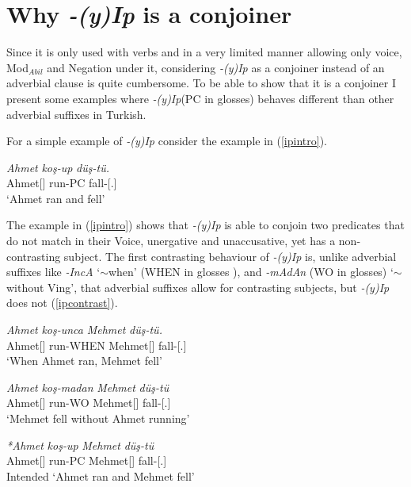 \section{Why \textit{-(y)Ip} is a conjoiner}

Since it is only used with verbs and in a very limited manner allowing only voice, Mod$_{Abil}$ and Negation under it, considering \textit{-(y)Ip} as a conjoiner instead of an adverbial clause is quite cumbersome. To be able to show that it is a conjoiner I present some examples where \textit{-(y)Ip}(PC in glosses) behaves different than other adverbial suffixes in Turkish.

For a simple example of \textit{-(y)Ip} consider the example in (\ref{ipintro}).

\begin{exe}
    \ex \label{ipintro}
    \gll 
    \textit{Ahmet} \textit{koş-up} \textit{düş-tü.} \\ Ahmet[{\Nom}] run-PC fall-{\Pst}[{\Third}.{\Sg}] \\
    \glt `Ahmet ran and fell'
\end{exe}

The example in (\ref{ipintro}) shows that \textit{-(y)Ip} is able to conjoin two predicates that do not match in their Voice, unergative and unaccusative, yet has a non-contrasting subject. The first contrasting behaviour of \textit{-(y)Ip} is, unlike adverbial suffixes like \textit{-IncA} `$\sim$when' (WHEN in glosses ), and \textit{-mAdAn} (WO in glosses) `$\sim$without Ving', that adverbial suffixes allow for contrasting subjects, but \textit{-(y)Ip} does not (\ref{ipcontrast}).

\begin{exe}
    \ex \label{ipcontrast}
    \begin{xlist}
        \ex \gll 
        \textit{Ahmet} \textit{koş-unca} \textit{Mehmet} \textit{düş-tü.} \\ Ahmet[{\Nom}] run-WHEN Mehmet[{\Nom}] fall-{\Pst}[{\Third}.{\Sg}] \\
        \glt `When Ahmet ran, Mehmet fell'
        
        \ex \gll 
        \textit{Ahmet} \textit{koş-madan} \textit{Mehmet} \textit{düş-tü} \\ Ahmet[{\Nom}] run-WO Mehmet[{\Nom}] fall-{\Pst}[{\Third}.{\Sg}] \\
        \glt `Mehmet fell without Ahmet running'
        
        \ex \gll 
        \textit{*Ahmet} \textit{koş-up} \textit{Mehmet} \textit{düş-tü} \\ Ahmet[{\Nom}] run-PC Mehmet[{\Nom}] fall-{\Pst}[{\Third}.{\Sg}] \\
        \glt Intended `Ahmet ran and Mehmet fell'
        
    \end{xlist}
\end{exe}

